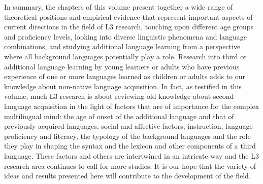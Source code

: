 \documentclass[output=paper,colorlinks,citecolor=brown,nonflat]{langsci/langscibook}
\begin{document}
In summary, the chapters of this volume present together a wide range of theoretical positions and empirical evidence that represent important aspects of current directions in the field of L3 research, touching upon different age groups and proficiency levels, looking into diverse linguistic phenomena and language combinations, and studying additional language learning from a perspective where all background languages potentially play a role. Research into third or additional language learning by young learners or adults who have previous experience of one or more languages learned as children or adults adds to our knowledge about non-native language acquisition. In fact, as testified in this volume, much L3 research is about reviewing old knowledge about second language acquisition in the light of factors that are of importance for the complex multilingual mind: the age of onset of the additional language and that of previously acquired languages, social and affective factors, instruction, language proficiency and literacy, the typology of the background languages and the role they play in shaping the syntax and the lexicon and other components of a third language. These factors and others are intertwined in an intricate way and the L3 research area continues to call for more studies. It is our hope that the variety of ideas and results presented here will contribute to the development of the field.

\sloppy\printbibliography[heading=subbibliography,notkeyword=this]
\end{document}
